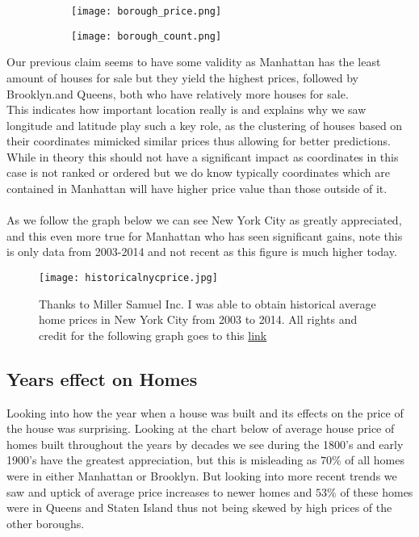\documentclass{article}
\begin{document}
\begin{titlepage}
\begin{figure}[ht]

\begin{subfigure}{.5\textwidth}
\texttt{[image: borough\_price.png]} 
\label{fig:subim3}
\end{subfigure}
\begin{subfigure}{.5\textwidth}
\texttt{[image: borough\_count.png]}
\label{fig:subim4}
\end{subfigure}
\newline
\label{fig:image3}
\end{figure}


Our previous claim seems to have some validity as Manhattan has the least amount of houses for sale but they yield the highest prices, followed by Brooklyn.and Queens, both who have relatively more houses for sale. \\

This indicates how important location really is and explains why we saw longitude and latitude play such a key role, as the clustering of houses based on their coordinates mimicked similar prices thus allowing for better predictions. While in theory this should not have a significant impact as coordinates in this case is not ranked or ordered but we do know typically coordinates which are contained in Manhattan will have higher price value than those outside of it.\\
\\
As we follow the graph below we can see New York City as greatly appreciated, and this even more true for Manhattan who has seen significant gains, note this is only data from 2003-2014 and not recent as this figure is much higher today.
\begin{figure}[ht]
    
\texttt{[image: historicalnycprice.jpg]}
\caption{Thanks to Miller Samuel Inc. I was able to obtain historical average home prices in New York City from 2003 to 2014. All rights and credit for the following graph goes to this \href{https://www.millersamuel.com/charts/new-york-city-residential-average-sales-price-includingexcluding-manhattan/}{link}}

\end{figure}

\subsection{Years effect on Homes}
Looking into how the year when a house was built and its effects  on the price of the house was surprising. Looking at the chart below of average house price of homes built throughout the years by decades we see during the 1800's and early 1900's have the greatest appreciation, but this is misleading as $70\%$ of all homes were in either Manhattan or Brooklyn. But looking into more recent trends we saw and uptick of average price increases to newer homes and $53\%$ of these homes were in Queens and Staten Island thus not being skewed by high prices of the other boroughs. 


\end{titlepage}
\end{document}
